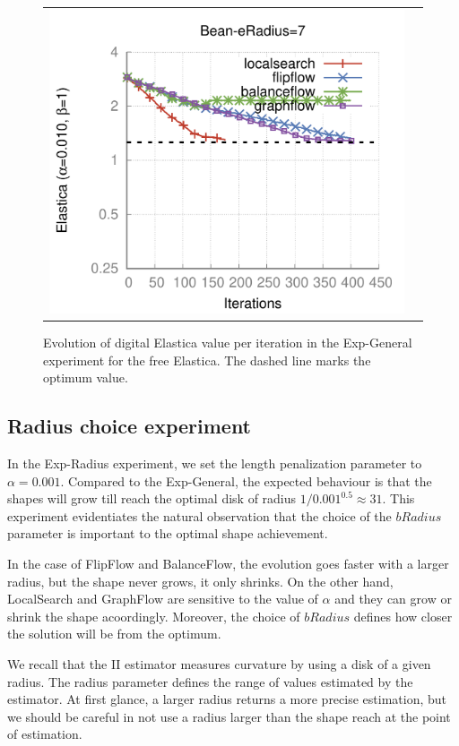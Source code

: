 \begin{figure}
\begin{tabular}{cc}
\includegraphics[scale=0.45]{figures/chapter9/free-elastica/plots/iteration/main_experiment/len_pen_0.01/radius-7/bean.pdf}
\end{tabular}
\caption{Evolution of digital Elastica value per iteration in the Exp-General experiment for the free Elastica. The dashed line marks the optimum value.}
\label{fig:plots-free-elastica-general}
\end{figure}

\subsection{Radius choice experiment}

In the Exp-Radius experiment, we set the length penalization parameter to $\alpha=0.001$. Compared to the Exp-General, the expected behaviour is that the shapes will grow till reach the optimal disk of radius $1/0.001^{0.5} \approx 31$. This experiment evidentiates the natural observation that the choice of the $bRadius$ parameter is important to the optimal shape achievement.

In the case of FlipFlow and BalanceFlow, the evolution goes faster with a larger radius, but the shape never grows, it only shrinks. On the other hand, LocalSearch and GraphFlow are sensitive to the value of $\alpha$ and they can grow or shrink the shape acoordingly. Moreover, the choice of $bRadius$ defines how closer the solution will be from the optimum.

We recall that the II estimator measures curvature by using a disk of a given radius. The radius parameter defines the range of values estimated by the estimator. At first glance, a larger radius returns a more precise estimation, but we should be careful in not use a radius larger than the shape reach at the point of estimation.

